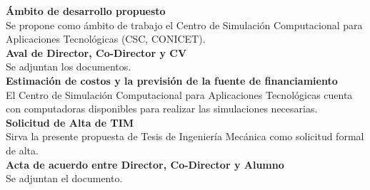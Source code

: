 \documentclass{article}
\numberwithin{equation}{subsection}
\begin{document}
\newpage
\noindent \textbf{Ámbito de desarrollo propuesto}\\
\indent Se propone como ámbito de trabajo el Centro de Simulación Computacional para Aplicaciones Tecnológicas (CSC, CONICET).\\

\noindent  \textbf{Aval de Director, Co-Director y CV}\\
\indent Se adjuntan los documentos.\\

\noindent \textbf{Estimación de costos y la previsión de la fuente de financiamiento}\\
\indent El Centro de Simulación Computacional para Aplicaciones Tecnológicas cuenta con computadoras disponibles para realizar las simulaciones necesarias.\\

\noindent \textbf{Solicitud de Alta de TIM}\\
\indent Sirva la presente propuesta de Tesis de Ingeniería Mecánica como solicitud formal de alta.\\

\noindent  \textbf{Acta de acuerdo entre Director, Co-Director y Alumno}\\
\indent Se adjuntan el documento.\\
\end{document}
